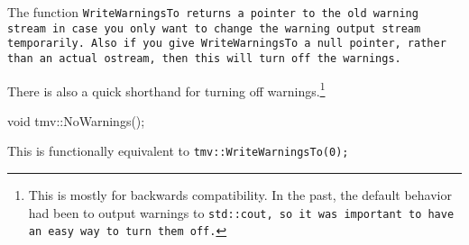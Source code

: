 The function \tt{WriteWarningsTo} returns a pointer to the old warning stream
in case you only want to change the warning output stream temporarily.
Also if you give \tt{WriteWarningsTo} a null pointer, rather than an actual \tt{ostream},
then this will turn off the warnings.

There is also a quick shorthand for turning off warnings.\footnote{
This is mostly for backwards compatibility.
In the past, the default behavior had been to output warnings to \tt{std::cout},
so it was important to have an easy way to turn them off.}
\begin{tmvcode}
void tmv::NoWarnings();
\end{tmvcode}
This is functionally equivalent to \tt{tmv::WriteWarningsTo(0);}

